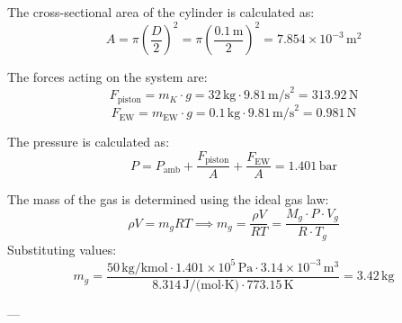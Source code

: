 The cross-sectional area of the cylinder is calculated as:  
\[
A = \pi \left(\frac{D}{2}\right)^2 = \pi \left(\frac{0.1 \, \text{m}}{2}\right)^2 = 7.854 \times 10^{-3} \, \text{m}^2
\]  

The forces acting on the system are:  
\[
F_{\text{piston}} = m_K \cdot g = 32 \, \text{kg} \cdot 9.81 \, \text{m/s}^2 = 313.92 \, \text{N}
\]  
\[
F_{\text{EW}} = m_{\text{EW}} \cdot g = 0.1 \, \text{kg} \cdot 9.81 \, \text{m/s}^2 = 0.981 \, \text{N}
\]  

The pressure is calculated as:  
\[
P = P_{\text{amb}} + \frac{F_{\text{piston}}}{A} + \frac{F_{\text{EW}}}{A} = 1.401 \, \text{bar}
\]  

The mass of the gas is determined using the ideal gas law:  
\[
\rho V = m_g R T \implies m_g = \frac{\rho V}{RT} = \frac{M_g \cdot P \cdot V_g}{R \cdot T_g}
\]  
Substituting values:  
\[
m_g = \frac{50 \, \text{kg/kmol} \cdot 1.401 \times 10^5 \, \text{Pa} \cdot 3.14 \times 10^{-3} \, \text{m}^3}{8.314 \, \text{J/(mol·K)} \cdot 773.15 \, \text{K}} = 3.42 \, \text{kg}
\]  

---
